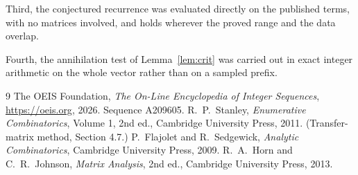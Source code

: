 \documentclass[11pt,a4paper]{article}
\theoremstyle{plain}
\theoremstyle{definition}
\begin{document}
Third, the conjectured recurrence was evaluated directly on the published terms, with no
matrices involved, and holds wherever the proved range and the data overlap.

Fourth, the annihilation test of Lemma~\ref{lem:crit} was carried out in exact integer
arithmetic on the whole vector rather than on a sampled prefix.

\begin{thebibliography}{9}
 The OEIS Foundation, \emph{The On-Line Encyclopedia of Integer
Sequences}, \url{https://oeis.org}, 2026. Sequence A209605.
 R.~P.~Stanley, \emph{Enumerative Combinatorics}, Volume 1, 2nd ed.,
Cambridge University Press, 2011. (Transfer-matrix method, Section 4.7.)
 P.~Flajolet and R.~Sedgewick, \emph{Analytic Combinatorics}, Cambridge
University Press, 2009.
 R.~A.~Horn and C.~R.~Johnson, \emph{Matrix Analysis}, 2nd ed., Cambridge
University Press, 2013.
\end{thebibliography}
\end{document}
